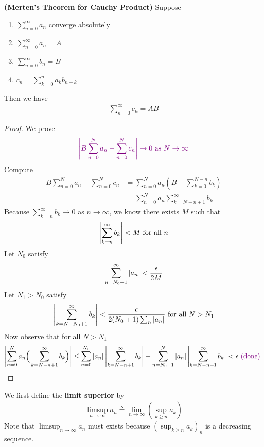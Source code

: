 \documentclass{report}
\begin{document}
\begin{theorem}
\label{Merten Cau}
\textbf{(Merten's Theorem for Cauchy Product)} Suppose 
\begin{enumerate}[label=(\alph*)]
  \item $\sum_{n=0}^\infty a_n$ converge absolutely 
  \item $\sum_{n=0}^\infty a_n=A$
  \item $\sum_{n=0}^\infty b_n=B$ 
  \item $c_n=\sum_{k=0}^n a_kb_{n-k}$
\end{enumerate}
Then we have 
\begin{align*}
\sum_{n=0}^{\infty}c_n=AB
\end{align*}
\end{theorem}
\begin{proof}
We prove 
\begin{align*}
  \textcolor{violet}{\left|B\sum_{n=0}^N a_n- \sum_{n=0}^Nc_n\right|\to 0\text{ as }N\to \infty}
\end{align*}
Compute 
\begin{align*}
B\sum_{n=0}^N a_n - \sum_{n=0}^N c_n&=\sum_{n=0}^N a_n (B-\sum_{k=0}^{N-n}b_k)\\
&=\sum_{n=0}^N a_n \sum_{k=N-n+1}^{\infty}b_k
\end{align*}
Because $\sum_{k=n}^{\infty}b_k\to 0$ as $n\to \infty$, we know there exists $M$ such that 
\begin{align*}
\label{me1}
\left|\sum_{k=n}^{\infty}b_k\right|<M\text{ for all }n
\end{align*}
Let $N_0$ satisfy 
 \begin{align*}
\sum_{n=N_0+1}^{\infty} \left|a_n\right|< \frac{\epsilon }{2M}
\end{align*}
Let $N_1>N_0$ satisfy 
 \begin{align*}
  \label{me2}
   \left|\sum_{k=N-N_0+1}^{\infty}b_k\right|<\frac{\epsilon}{2(N_0+1)\sum_n \left|a_n\right|} \text{ for all }N>N_1
\end{align*}
Now observe that for all $N>N_1$
\begin{align*}
  \left|\sum_{n=0}^N a_n \Big(\sum_{k=N-n+1}^\infty b_k \Big)\right|\leq \sum_{n=0}^{N_0} \left|a_n\right| \left|\sum_{k=N-n+1}^{\infty}b_k\right|+ \sum_{n=N_0+1}^{N} \left|a_n\right| \left|\sum_{k=N-n+1}^{\infty}b_k\right|<\epsilon \textcolor{violet}{\text{ (done) }} 
\end{align*}
\end{proof}
\begin{mdframed}
We first define the \textbf{limit superior} by 
\begin{align*}
\limsup_{n\to\infty} a_n\triangleq \lim_{n\to \infty} (\sup_{k\geq n}a_k)
\end{align*}
Note that $\limsup_{n\to\infty} a_n$ must exists because $(\sup_{k\geq n}a_k)_n$ is a decreasing sequence. 
\end{mdframed}
\end{document}
